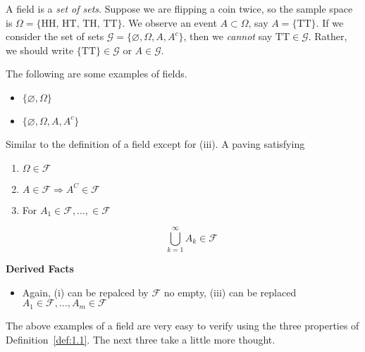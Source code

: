 \documentclass[11pt,fleqn]{book} %
\begin{document}
\begin{remark} \label{rem:1.1}
	A field is a \emph{set of sets}. Suppose we are flipping a coin twice, so the sample space is $\Omega = \{\textrm{HH, HT, TH, TT}\}$. We observe an event $A \subset \Omega$, say $A = \{\textrm{TT}\}$. If we consider the set of sets $\mathcal{G} = \{\varnothing, \Omega, A, A^c\}$, then we \emph{cannot} say $\textrm{TT} \in \mathcal{G}$. Rather, we should write $\{\textrm{TT}\} \in \mathcal{G}$ or $A \in \mathcal{G}$.
\end{remark}

The following are some examples of fields.

\begin{itemize}
	\item $\{\varnothing, \Omega\}$
	\item $\{\varnothing, \Omega, A, A^c\}$
\end{itemize}


\begin{definition} Similar to the definition of a field except for (iii). A paving satisfying 
	\begin{enumerate}[label = (\roman*)]
		\item $\Omega \in \mathcal{F}$
		\item $A \in \mathcal{F} \Rightarrow A^C \in \mathcal{F}$
		\item For $A_1 \in \mathcal{F}, \dots,  \in \mathcal{F}$ 

				$$\bigcup_{k=1}^\infty A_k \in \mathcal{F}$$

	\end{enumerate}

\end{definition}


	


\textbf{Derived Facts}

\begin{itemize}
	\item Again, (i) can be repalced by $\mathcal{F}$ no empty, 
				(iii) can be replaced  $A_1 \in \mathcal{F}, \dots, A_m \in \mathcal{F} $
\end{itemize}

The above examples of a field are very easy to verify using the three properties of Definition~\ref{def:1.1}. The next three take a little more thought.
\end{document}
